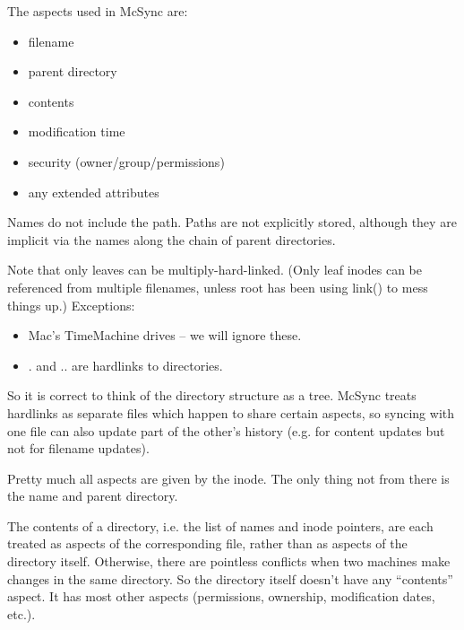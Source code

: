 \documentclass{book}
\begin{document}
The aspects used in McSync are:
\begin{itemize}
  \item  filename                              
  \item  parent directory                      
  \item  contents                              
  \item  modification time                     
  \item  security (owner/group/permissions)    
  \item  any extended attributes               
\end{itemize}

Names do not include the path.
Paths are not explicitly stored, although they are implicit via the names along the chain of parent directories.

Note that only leaves can be multiply-hard-linked.  (Only leaf inodes can be referenced from multiple filenames, unless root has been using link() to mess things up.)
Exceptions:
\begin{itemize}
\item Mac's TimeMachine drives -- we will ignore these.
\item . and .. are hardlinks to directories.
\end{itemize}
So it is correct to think of the directory structure as a tree.  McSync treats hardlinks as separate files which happen to share certain aspects, so syncing with one file can also update part of the other's history (e.g. for content updates but not for filename updates).

Pretty much all aspects are given by the inode.  The only thing not from there is the name and parent directory.

The contents of a directory, i.e. the list of names and inode pointers, are each treated as aspects of the corresponding file, rather than as aspects of the directory itself.  Otherwise, there are pointless conflicts when two machines make changes in the same directory.  So the directory itself doesn't have any ``contents'' aspect.  It has most other aspects (permissions, ownership, modification dates, etc.).
\end{document}
